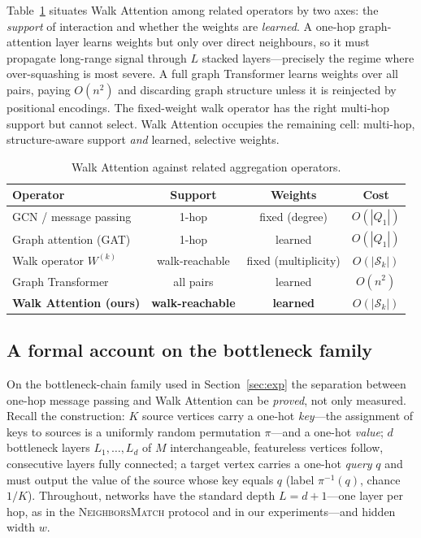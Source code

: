 Table~\ref{tab:relation} situates Walk Attention among related operators by two
axes: the \emph{support} of interaction and whether the weights are
\emph{learned}. A one-hop graph-attention layer \cite{velickovic2017graph} learns
weights but only over direct neighbours, so it must propagate long-range signal
through $L$ stacked layers---precisely the regime where over-squashing is most
severe. A full graph Transformer \cite{vaswani2017attention} learns weights over
all pairs,
paying $O(n^2)$ and discarding graph structure unless it is reinjected by
positional encodings. The fixed-weight walk operator has the right multi-hop
support but cannot select. Walk Attention occupies the remaining cell: multi-hop,
structure-aware support \emph{and} learned, selective weights.

\begin{table}[t]
\centering
\caption{Walk Attention against related aggregation operators.}
\label{tab:relation}
\begin{tabular}{lccc}
\toprule
\textbf{Operator} & \textbf{Support} & \textbf{Weights} & \textbf{Cost} \\
\midrule
GCN / message passing       & 1-hop      & fixed (degree) & $O(|Q_1|)$ \\
Graph attention (GAT)       & 1-hop      & learned        & $O(|Q_1|)$ \\
Walk operator $W^{(k)}$     & walk-reachable & fixed (multiplicity) & $O(|\mathcal{S}_k|)$ \\
Graph Transformer           & all pairs  & learned        & $O(n^2)$ \\
\textbf{Walk Attention (ours)} & \textbf{walk-reachable} & \textbf{learned} & $O(|\mathcal{S}_k|)$ \\
\bottomrule
\end{tabular}
\end{table}

\subsection{A formal account on the bottleneck family}\label{sec:theory}

On the bottleneck-chain family used in Section~\ref{sec:exp} the separation
between one-hop message passing and Walk Attention can be \emph{proved}, not
only measured. Recall the construction: $K$ source vertices carry a one-hot
\emph{key}---the assignment of keys to sources is a uniformly random
permutation $\pi$---and a one-hot \emph{value}; $d$ bottleneck layers
$L_1,\dots,L_d$ of $M$ interchangeable, featureless vertices follow,
consecutive layers fully connected; a target vertex carries a one-hot
\emph{query} $q$ and must output the value of the source whose key equals $q$
(label $\pi^{-1}(q)$, chance $1/K$). Throughout, networks have the standard
depth $L=d+1$---one layer per hop, as in the \textsc{NeighborsMatch} protocol
\cite{alon2021bottleneck} and in our experiments---and hidden width $w$.

